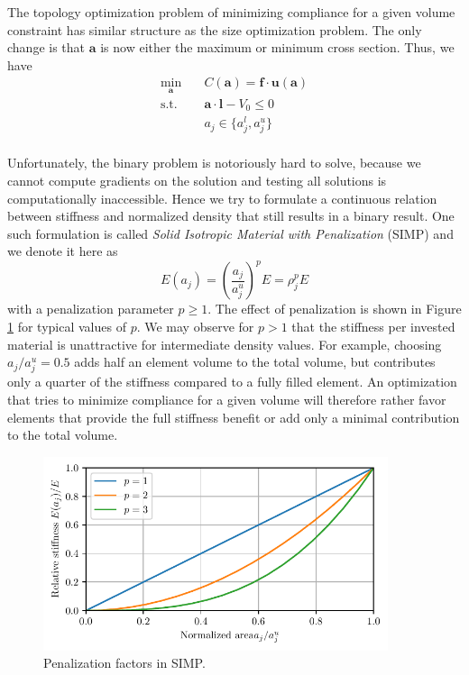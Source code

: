 The topology optimization problem of minimizing compliance for a given volume constraint has similar structure as the size optimization problem. The only change is that $\mathbf{a}$ is now either the maximum or minimum cross section. Thus, we have 
\begin{equation}
    \begin{aligned}
        \min_{\mathbf{a}} \quad & C(\mathbf{a}) = \mathbf{f} \cdot \mathbf{u}(\mathbf{a})\\
        \textrm{s.t.} \quad & \mathbf{a} \cdot \mathbf{l} - V_0 \le 0  \\
                            & a_j \in \{a_j^l, a_j^u\}\\
    \end{aligned}
\end{equation}

Unfortunately, the binary problem is notoriously hard to solve, because we cannot compute gradients on the solution and testing all solutions is computationally inaccessible. Hence we try to formulate a continuous relation between stiffness and normalized density that still results in a binary result. One such formulation is called \emph{Solid Isotropic Material with Penalization} (SIMP) and we denote it here as 
\begin{equation}
    E(a_j)= \left(\frac{a_j}{a_j^u}\right)^p E = \rho_j^p E
\end{equation}
with a penalization parameter $p \ge 1$. 
The effect of penalization is shown in Figure \ref{fig:simp_truss} for typical values of $p$. We may observe for $p>1$ that the stiffness per invested material is unattractive for intermediate density values. For example, choosing $a_j/a_j^u=0.5$ adds half an element volume to the total volume, but contributes only a quarter of the stiffness compared to a fully filled element. An optimization that tries to minimize compliance for a given volume will therefore rather favor elements that provide the full stiffness benefit or add only a minimal contribution to the total volume.

\begin{figure}[!htpb]
    \centering
    \includegraphics[width=0.9\textwidth]{figures/simp_truss.pdf}
    \caption{Penalization factors in SIMP.}
    \label{fig:simp_truss}
\end{figure}

